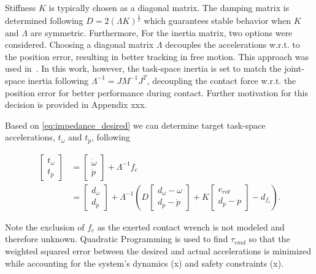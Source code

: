 \documentclass[a4paper, 10pt, conference]{ieeeconf}
\begin{document}
    Stiffness $K$ is typically chosen as a diagonal matrix. The damping matrix is determined following $D = 2(\Lambda K)^{\frac{1}{2}}$ which guarantees stable behavior when $K$ and $\Lambda$ are symmetric. Furthermore, For the inertia matrix, two options were considered. Choosing a diagonal matrix $\Lambda$ decouples the accelerations w.r.t. to the position error, resulting in better tracking in free motion. This approach was used in~\cite{vanoorschotDesignNumericalValidation2022}. In this work, however, the task-space inertia is set to match the joint-space inertia following $\Lambda^{-1} = JM^{-1}J^T$, decoupling the contact force w.r.t. the position error for better performance during contact. Further motivation for this decision is provided in Appendix xxx. %

    Based on \ref{eq:impedance_desired} we can determine target task-space accelerations, $t_{\dot{\omega}}$ and $t_{\ddot{p}}$, following
    
    \begin{align} \begin{bmatrix}t_{\dot{\omega}}\\ t_{\ddot{p}}\end{bmatrix} &= \begin{bmatrix} {\dot{\omega}}\\{\ddot{p}}\end{bmatrix}+\Lambda^{-1} f_c\\
     &=     \begin{bmatrix} d_{\dot{\omega}}    \\ d_{\ddot{p}}  \end{bmatrix} +\Lambda^{-1} \left ( D \begin{bmatrix}d_\omega - {\omega} \\ d_{\dot{p}} - \dot{p} \end{bmatrix}  + K \begin{bmatrix} e_{rot} \\d_p - {p}  \end{bmatrix}- d_{f_c} \right ).
    \end{align}

    Note the exclusion of $f_c$ as the exerted contact wrench is not modeled and therefore unknown. Quadratic Programming is used to find $\tau_{cmd}$ so that the weighted squared error between the desired and actual accelerations is minimized while accounting for the system's dynamics (x) and safety constraints (x). 
\end{document}
